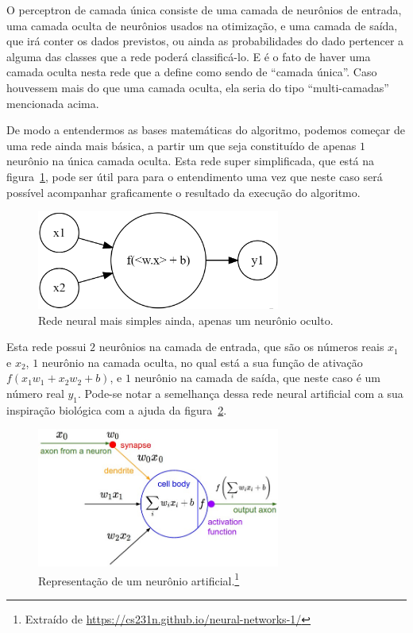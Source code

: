 O perceptron de camada única consiste de uma camada de neurônios de entrada, uma camada oculta de neurônios usados na otimização, e uma camada de saída, que irá conter os dados previstos, ou ainda as probabilidades do dado pertencer a alguma das classes que a rede poderá classificá-lo. E é o fato de haver uma camada oculta nesta rede que a define como sendo de ``camada única''. Caso houvessem mais do que uma camada oculta, ela seria do tipo ``multi-camadas'' mencionada acima.

De modo a entendermos as bases matemáticas do algoritmo, podemos começar de uma rede ainda mais básica, a partir um  que seja constituído de apenas $1$ neurônio na única camada oculta. Esta rede super simplificada, que está na figura~\ref{fig:neuronio}, pode ser útil para para o entendimento uma vez que neste caso será possível acompanhar graficamente o resultado da execução do algoritmo.

\begin{figure}[htb]
\centering
\includegraphics[width=8cm]{figuras/neuronio}
\caption{Rede neural mais simples ainda, apenas um neurônio oculto.}
\label{fig:neuronio}
\end{figure}

Esta rede possui $2$ neurônios na camada de entrada, que são os números reais $x_1$ e $x_2$, $1$ neurônio na camada oculta, no qual está a sua função de ativação $f(x_1w_1 + x_2w_2 + b)$, e $1$ neurônio na camada de saída, que neste caso é um número real $y_1$. Pode-se notar a semelhança dessa rede neural artificial com a sua inspiração biológica com a ajuda da figura~\ref{fig:neuron_model}. 

\begin{figure}[htb]
\centering
\includegraphics[width=8cm]{figuras/neuron_model}
\caption{Representação de um neurônio artificial.\footnote{Extraído de \url{https://cs231n.github.io/neural-networks-1/}}}
\label{fig:neuron_model}
\end{figure}

